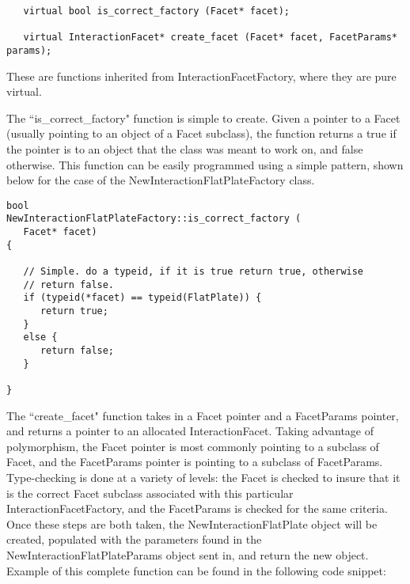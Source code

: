 \begin{verbatim}
   virtual bool is_correct_factory (Facet* facet);

   virtual InteractionFacet* create_facet (Facet* facet, FacetParams* params);

\end{verbatim}

These are functions inherited from InteractionFacetFactory, where they are
pure virtual.

The ``is\_correct\_factory" function is simple to create. Given a pointer to a Facet
(usually pointing to an object of a Facet subclass), the
function returns a true if the pointer is to an object that the
class was meant to work on, and false otherwise. This function can be
easily programmed using a simple pattern, shown below for the case of
the NewInteractionFlatPlateFactory class.

\begin{verbatim}
bool
NewInteractionFlatPlateFactory::is_correct_factory (
   Facet* facet)
{

   // Simple. do a typeid, if it is true return true, otherwise
   // return false.
   if (typeid(*facet) == typeid(FlatPlate)) {
      return true;
   }
   else {
      return false;
   }

}
\end{verbatim}

The ``create\_facet" function takes in a Facet pointer and a FacetParams
pointer, and returns a pointer to an allocated InteractionFacet.
Taking advantage of polymorphism, the Facet pointer is most commonly
pointing to a subclass of Facet, and the FacetParams pointer is
pointing to a subclass of FacetParams. Type-checking is done at
a variety of levels: the Facet is checked to insure that it is
the correct Facet subclass associated with this particular
InteractionFacetFactory, and the FacetParams is checked for the
same criteria. Once these steps are both taken, the NewInteractionFlatPlate
object will be created, populated with the parameters found in
the NewInteractionFlatPlateParams object sent in, and return the
new object. Example of this complete function can be found
in the following code snippet:


